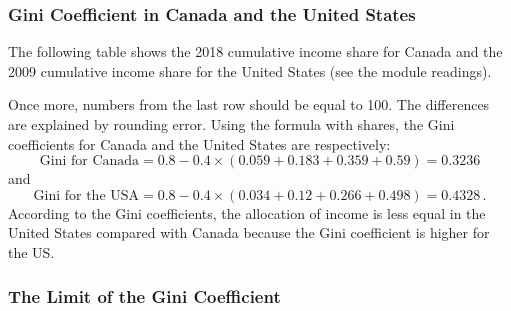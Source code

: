\documentclass[letterpaper]{article}\usepackage[]{graphicx}\usepackage[]{color}
\numberwithin{exer}{section}
\theoremstyle{nonumberplain}
\begin{document}
\subsubsection*{Gini Coefficient in Canada and the United States}

The following table shows the 2018 cumulative income share for Canada
and the 2009 cumulative income share for the United States (see the
module readings). 
\begin{center} 
\end{center}
Once more, numbers from the last row should be equal to 100. The
differences are explained by rounding error. Using the formula with
shares, the Gini coefficients for Canada and the United States are
respectively:
\[
\mbox{Gini for Canada} = 0.8 - 0.4\times
(0.059+0.183+0.359+0.59) = 0.3236
\]
and
\[
\mbox{Gini for the USA} = 0.8 - 0.4\times
(0.034+0.12+0.266+0.498) = 0.4328\,.
\]
According to the Gini coefficients, the allocation of income is less
equal in the United States compared with Canada because the Gini
coefficient is higher for the US.



\subsubsection*{The Limit of the Gini Coefficient}
\end{document}
